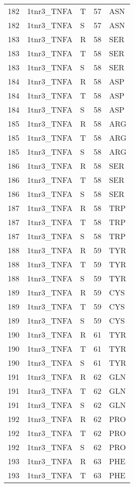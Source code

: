 \begin{tiny}
\begin{longtable}[l]{l|l|l|l|l}
	182 & 1tnr3\_TNFA & T & 57 & ASN \\
	182 & 1tnr3\_TNFA & S & 57 & ASN \\
	183 & 1tnr3\_TNFA & R & 58 & SER \\
	183 & 1tnr3\_TNFA & T & 58 & SER \\
	183 & 1tnr3\_TNFA & S & 58 & SER \\
	184 & 1tnr3\_TNFA & R & 58 & ASP \\
	184 & 1tnr3\_TNFA & T & 58 & ASP \\
	184 & 1tnr3\_TNFA & S & 58 & ASP \\
	185 & 1tnr3\_TNFA & R & 58 & ARG \\
	185 & 1tnr3\_TNFA & T & 58 & ARG \\
	185 & 1tnr3\_TNFA & S & 58 & ARG \\
	186 & 1tnr3\_TNFA & R & 58 & SER \\
	186 & 1tnr3\_TNFA & T & 58 & SER \\
	186 & 1tnr3\_TNFA & S & 58 & SER \\
	187 & 1tnr3\_TNFA & R & 58 & TRP \\
	187 & 1tnr3\_TNFA & T & 58 & TRP \\
	187 & 1tnr3\_TNFA & S & 58 & TRP \\
	188 & 1tnr3\_TNFA & R & 59 & TYR \\
	188 & 1tnr3\_TNFA & T & 59 & TYR \\
	188 & 1tnr3\_TNFA & S & 59 & TYR \\
	189 & 1tnr3\_TNFA & R & 59 & CYS \\
	189 & 1tnr3\_TNFA & T & 59 & CYS \\
	189 & 1tnr3\_TNFA & S & 59 & CYS \\
	190 & 1tnr3\_TNFA & R & 61 & TYR \\
	190 & 1tnr3\_TNFA & T & 61 & TYR \\
	190 & 1tnr3\_TNFA & S & 61 & TYR \\
	191 & 1tnr3\_TNFA & R & 62 & GLN \\
	191 & 1tnr3\_TNFA & T & 62 & GLN \\
	191 & 1tnr3\_TNFA & S & 62 & GLN \\
	192 & 1tnr3\_TNFA & R & 62 & PRO \\
	192 & 1tnr3\_TNFA & T & 62 & PRO \\
	192 & 1tnr3\_TNFA & S & 62 & PRO \\
	193 & 1tnr3\_TNFA & R & 63 & PHE \\
	193 & 1tnr3\_TNFA & T & 63 & PHE \\

\end{longtable}
\end{tiny}
